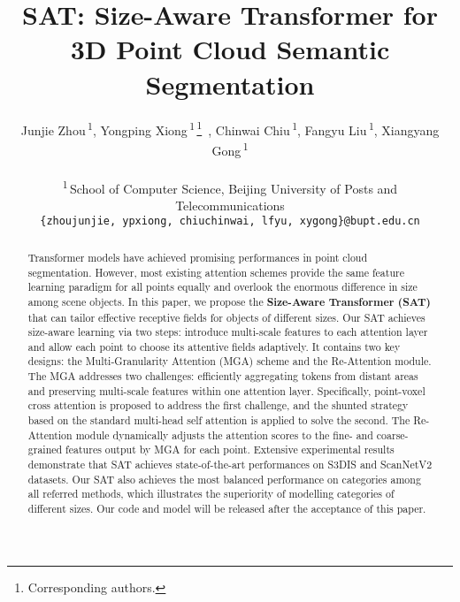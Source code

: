\documentclass[10pt,twocolumn,letterpaper]{article}
\begin{document}
\title{SAT: Size-Aware Transformer for 3D Point Cloud Semantic Segmentation}

\author{Junjie Zhou\,\textsuperscript{\rm 1}, Yongping Xiong\,\textsuperscript{\rm 1}\,\thanks{Corresponding authors.}~, Chinwai Chiu\,\textsuperscript{\rm 1}, Fangyu Liu\,\textsuperscript{\rm 1}, Xiangyang Gong\,\textsuperscript{\rm 1}\\
 \\
\textsuperscript{\rm 1}\,School of Computer Science, Beijing University of Posts and Telecommunications\\
{\tt\small
\{zhoujunjie, ypxiong, chiuchinwai, lfyu, xygong\}@bupt.edu.cn\ 
}
}
\maketitle
\begin{abstract}

Transformer models have achieved promising performances in point cloud segmentation. However, most existing attention schemes provide the same feature learning paradigm for all points equally and overlook the enormous difference in size among scene objects. In this paper, we propose the \textbf{Size-Aware Transformer (SAT)} that can tailor effective receptive fields for objects of different sizes. 
Our SAT achieves size-aware learning via two steps: introduce multi-scale features to each attention layer and allow each point to choose its attentive fields adaptively. It contains two key designs: the Multi-Granularity Attention (MGA) scheme and the Re-Attention module.
The MGA addresses two challenges: efficiently aggregating tokens from distant areas and preserving multi-scale features within one attention layer. Specifically, point-voxel cross attention is proposed to address the first challenge, and the shunted strategy based on the standard multi-head self attention is applied to solve the second.  
The Re-Attention module dynamically adjusts the attention scores to the fine- and coarse-grained features output by MGA for each point.
Extensive experimental results demonstrate that SAT achieves state-of-the-art performances on S3DIS\cite{datasets3dis} and ScanNetV2\cite{datasetscannet} datasets. Our SAT also achieves the most balanced performance on categories among all referred methods, which illustrates the superiority of modelling categories of different sizes.
Our code and model will be released after the acceptance of this paper.
\end{abstract}
\end{document}
